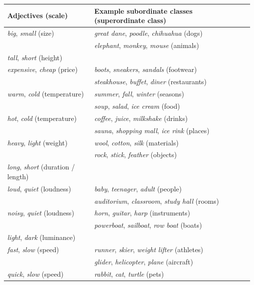 \documentclass[doc]{apa6}
\begin{document}
\begin{table}[ht]
\centering
\begingroup\fontsize{10pt}{11pt}\selectfont
\begin{tabularx}{\textwidth}{lll}
  \hline
Adjectives (scale) & Example subordinate classes (superordinate class) \\ 
  \hline
  \emph{big}, \emph{small} (size) & \emph{great dane}, \emph{poodle}, \emph{chihuahua} (dogs) \\ 
 & \emph{elephant}, \emph{monkey}, \emph{mouse} (animals) \\ 
\emph{tall}, \emph{short} (height) & \\ 
  \emph{expensive}, \emph{cheap} (price) & \emph{boots}, \emph{sneakers}, \emph{sandals} (footwear) \\ 
   & \emph{steakhouse}, \emph{buffet}, \emph{diner} (restaurants) \\ 
    \emph{warm}, \emph{cold} (temperature) & \emph{summer}, \emph{fall}, \emph{winter} (seasons) \\ 
& \emph{soup}, \emph{salad}, \emph{ice cream} (food) \\ 
    \emph{hot}, \emph{cold} (temperature) & \emph{coffee}, \emph{juice}, \emph{milkshake} (drinks) \\ 
& \emph{sauna}, \emph{shopping mall}, \emph{ice rink} (places) \\ 
  \emph{heavy}, \emph{light} (weight) &  \emph{wool}, \emph{cotton}, \emph{silk} (materials) \\ 
  &  \emph{rock}, \emph{stick}, \emph{feather} (objects) \\ 
  \emph{long}, \emph{short} (duration / length) &  \\ 
  \emph{loud}, \emph{quiet} (loudness) &   \emph{baby}, \emph{teenager}, \emph{adult} (people) \\ 
  &  \emph{auditorium}, \emph{classroom},   \emph{study hall} (rooms) \\ 
 \emph{noisy}, \emph{quiet} (loudness) &  \emph{horn}, \emph{guitar}, \emph{harp} (instruments) \\  
 &  \emph{powerboat}, \emph{sailboat}, \emph{row boat}  (boats) \\  
  \emph{light}, \emph{dark} (luminance) &  \\
  \emph{fast}, \emph{slow} (speed)   &  \emph{runner}, \emph{skier}, \emph{weight lifter} (athletes) \\
  &  \emph{glider}, \emph{helicopter}, \emph{plane} (aircraft) \\
  \emph{quick}, \emph{slow} (speed) &  \emph{rabbit}, \emph{cat}, \emph{turtle} (pets) \\

\end{tabularx}
\end{table}
\end{document}
